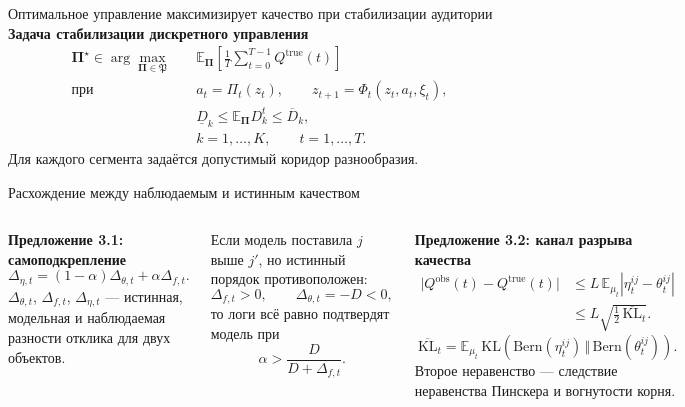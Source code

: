 \documentclass[aspectratio=43]{beamer}
\begin{document}
\begin{frame}{Оптимальное управление максимизирует качество при стабилизации аудитории}
\vspace{0.15em}
\textcolor{myNewColorA}{\textbf{Задача стабилизации дискретного управления}}
{\tiny
\[
\begin{aligned}
\boldsymbol\Pi^\star\in
\arg\max_{\boldsymbol\Pi\in\mathfrak P}\quad
&\mathbb E_{\boldsymbol\Pi}\!\left[
\frac1T\sum_{t=0}^{T-1}Q^{\mathrm{true}}(t)\right] \\
\text{при}\quad
&a_t=\Pi_t(z_t),\qquad
z_{t+1}=\Phi_t(z_t,a_t,\xi_t),\\
&\underline D_k\le
\mathbb E_{\boldsymbol\Pi}D_k^t
\le \overline D_k,\\
&k=1,\ldots,K,\qquad t=1,\ldots,T .
\end{aligned}
\]
Для каждого сегмента задаётся допустимый коридор разнообразия.}
\end{frame}

\begin{frame}{Расхождение между наблюдаемым и истинным качеством}
\footnotesize

\begin{columns}[T]
\textcolor{myNewColorA}{\textbf{Предложение 3.1: самоподкрепление}}
\[
\Delta_{\eta,t}
=(1-\alpha)\Delta_{\theta,t}+\alpha\Delta_{f,t}.
\]
{\scriptsize $\Delta_{\theta,t}$, $\Delta_{f,t}$, $\Delta_{\eta,t}$ — истинная, модельная и наблюдаемая разности отклика для двух объектов.}

\vspace{0.6em}
Если модель поставила $j$ выше $j'$, но истинный порядок противоположен:
\[
\Delta_{f,t}>0,\qquad \Delta_{\theta,t}=-D<0,
\]
то логи всё равно подтвердят модель при
\[
\alpha>\frac{D}{D+\Delta_{f,t}}.
\]

\textcolor{myNewColorA}{\textbf{Предложение 3.2: канал разрыва качества}}
\[
\begin{aligned}
\bigl|Q^{\mathrm{obs}}(t)-Q^{\mathrm{true}}(t)\bigr|
&\le L\,\mathbb E_{\mu_t}\!\left|\eta_t^{ij}-\theta_t^{ij}\right|\\
&\le L\sqrt{\frac12\,\overline{\mathrm{KL}}_t}.
\end{aligned}
\]
\[
\overline{\mathrm{KL}}_t=
\mathbb E_{\mu_t}\,
\mathrm{KL}\!\left(
\mathrm{Bern}(\eta_t^{ij})\,\Vert\,
\mathrm{Bern}(\theta_t^{ij})\right).
\]
{\scriptsize Второе неравенство — следствие неравенства Пинскера и вогнутости корня.}
\end{columns}

\vspace{0.65em}

\end{frame}
\end{document}
